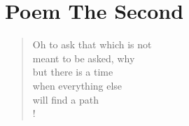 \section{Poem The Second}

\settowidth{\versewidth}{Than Tycho Brahe, or Erra Pater:}
\begin{verse}
Oh to ask that which is not \\
meant to be asked, why \\
but there is a time \\
when everything else \\
will find a path \\!
\end{verse}
